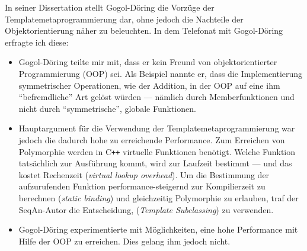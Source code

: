 \begin{description}
  In seiner Dissertation stellt Gogol-Döring die Vorzüge der Templatemetaprogrammierung dar, ohne jedoch die Nachteile der Objektorientierung näher zu beleuchten. In dem Telefonat mit Gogol-Döring \citep{GogolDoring:5iYhf2VJ} erfragte ich diese:
  \begin{itemize}
    \item Gogol-Döring teilte mir mit, dass er kein Freund von objektorientierter Programmierung (OOP) sei. Als Beispiel nannte er, dass die Implementierung symmetrischer Operationen, wie der Addition, in der OOP auf eine ihm ``befremdliche'' Art gelöst würden --- nämlich durch Memberfunktionen und nicht durch ``symmetrische'', globale Funktionen.
    \item Hauptargument für die Verwendung der Templatemetaprogrammierung war jedoch die dadurch hohe zu erreichende Performance. Zum Erreichen von Polymorphie werden in C{}\verb!++! virtuelle Funktionen benötigt. Welche Funktion tatsächlich zur Ausführung kommt, wird zur Laufzeit bestimmt --- und das kostet Rechenzeit (\textit{virtual lookup overhead}). Um die Bestimmung der aufzurufenden Funktion performance-steigernd zur Kompilierzeit zu berechnen (\textit{static binding}) und gleichzeitig Polymorphie zu erlauben, traf der SeqAn-Autor die Entscheidung,  (\textit{Template Subclassing}) zu verwenden.
    \item Gogol-Döring experimentierte mit Möglichkeiten, eine hohe Performance mit Hilfe der OOP zu erreichen. Dies gelang ihm jedoch nicht.
  \end{itemize}
  
  

\end{description}

